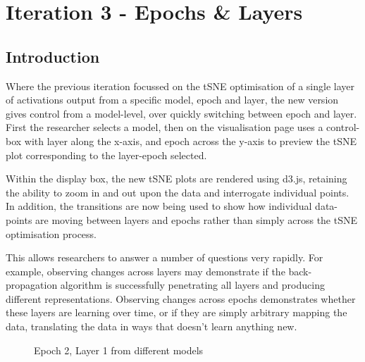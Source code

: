 \documentclass[a4paper,11pt,titlepage]{article}
\begin{document}
\clearpage 
				
\section{Iteration 3 - Epochs \& Layers}
	\subsection{Introduction}
	Where the previous iteration focussed on the tSNE optimisation of a single layer of activations output from a specific model, epoch and layer, the new version gives control from a model-level, over quickly switching between epoch and layer. First the researcher selects a model, then on the visualisation page uses a control-box with layer along the x-axis, and epoch across the y-axis to preview the tSNE plot corresponding to the layer-epoch selected.
	\par 
	Within the display box, the new tSNE plots are rendered using d3.js, retaining the ability to zoom in and out upon the data and interrogate individual points. In addition, the transitions are now being used to show how individual data-points are moving between layers and epochs rather than simply across the tSNE optimisation process.
	\par 
	This allows researchers to answer a number of questions very rapidly. For example, observing changes across layers may demonstrate if the back-propagation algorithm is successfully penetrating all layers and producing different representations. Observing changes across epochs demonstrates whether these layers are learning over time, or if they are simply arbitrary mapping the data, translating the data in ways that doesn't learn anything new.
	\par 
		
	\begin{figure}[H]
    			\caption{Epoch 2, Layer 1 from different models}%
	\end{figure}	
	
\end{document}
